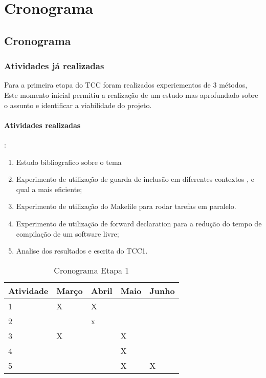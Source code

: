 \part{Cronograma}

\chapter[Cronograma]{Cronograma}

\section{Atividades já realizadas}

Para a primeira etapa do TCC foram realizados experiementos de 3 métodos,
 Este momento inicial permitiu a realização de um estudo mas aprofundado
 sobre o assunto e identificar a viabilidade do projeto.


\subsection{Atividades realizadas}:

\begin{enumerate}
	\item		Estudo bibliografico sobre o tema
	\item		Experimento de utilização de guarda de inclusão em diferentes contextos , e qual a mais eficiente;
	\item		Experimento de utilização do Makefile para rodar tarefas em paralelo.
	\item		Experimento de utilização de forward declaration para a redução do tempo de compilação de um software livre;
	\item		Analise dos resultados e escrita do TCC1.
\end{enumerate}

\begin{table}[h]
\centering
\begin{tabular}{|l|l|l|l|l|}
Atividade & Março & Abril & Maio & Junho \\ \hline
1         & X     & X     &      &       \\ \hline
2         &       & x     &      &       \\  \hline
3         & X     &       & X    &       \\ \hline
4         &       &       & X    &       \\ \hline
5         &       &       & X   & X   \\   \hline
\end{tabular} 
\caption{Cronograma Etapa 1}
\label{cronograma1}
\end{table}


